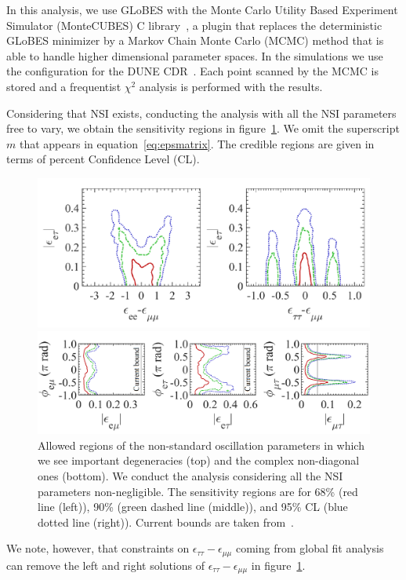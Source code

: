 In this analysis, we use GLoBES with the Monte Carlo Utility Based Experiment Simulator (MonteCUBES) C library~\cite{Blennow:2009pk}, a plugin that replaces the deterministic GLoBES minimizer by a Markov Chain Monte Carlo (MCMC) method that is able to handle higher dimensional parameter spaces. In the simulations we use the configuration for the DUNE CDR~\cite{Alion:2016uaj}. Each point scanned by the MCMC is stored and a frequentist $\chi^2$ analysis is performed with the results.

Considering that NSI exists, conducting the analysis with all the NSI parameters free to vary, we obtain the sensitivity regions in figure~\ref{fig:nsi}. We omit the superscript $m$ that appears in equation~\ref{eq:epsmatrix}. 
The credible regions are given in terms of percent Confidence Level (CL).
\begin{figure}[!htb]
	\centering
    \includegraphics[width=0.6\columnwidth]{graphics/TDR12.pdf}
    
    \includegraphics[width=0.75\columnwidth]{graphics/TDR4.pdf}
   \caption[NSI parameters. Allowed regions.]{\label{fig:nsi}Allowed regions of the non-standard oscillation parameters in which we see important degeneracies (top) and the complex non-diagonal ones (bottom). We conduct the analysis considering all the NSI parameters non-negligible. The sensitivity regions are for 68\% (red line (left)), 90\% (green dashed line (middle)), and 95\% CL (blue dotted line (right)). Current bounds are taken from~\cite{Gonzalez-Garcia:2013usa}.}
\end{figure}
We note, however, that constraints on $\epsilon_{\tau\tau}-\epsilon_{\mu\mu}$ coming from global fit analysis~\cite{Gonzalez-Garcia:2013usa,Miranda:2015dra,Farzan:2017xzy,Esteban:2018ppq} can remove the left and right solutions of $\epsilon_{\tau\tau}-\epsilon_{\mu\mu}$ in figure~\ref{fig:nsi}.

